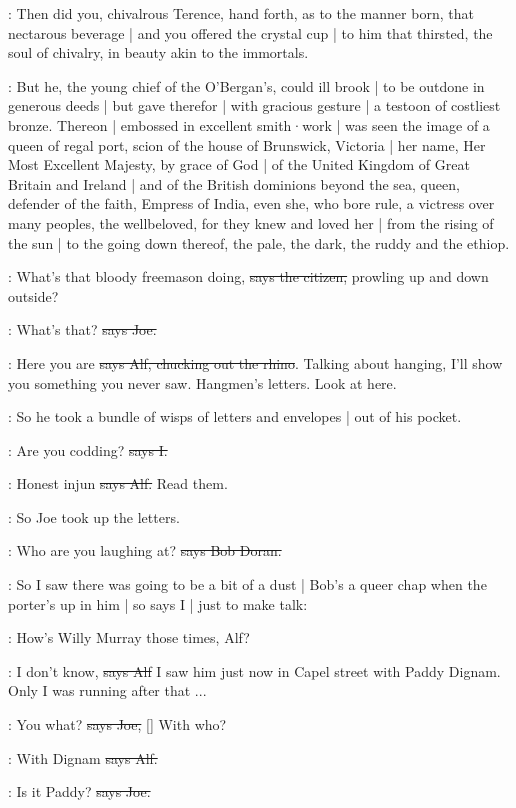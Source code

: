 :
Then did you,
chivalrous Terence,
hand forth,
as to the manner born,
that nectarous beverage |
and you offered the crystal cup |
to him that thirsted,
the soul of chivalry,
in beauty akin to the immortals.

:
But he,
the young chief of the O'Bergan's,
could ill brook |
to be outdone in generous deeds |
but gave therefor |
with gracious gesture |
a testoon of costliest bronze.
Thereon |
embossed in excellent smith·work |
was seen the image of a queen of regal port,
scion of the house of Brunswick,
Victoria |
her name,
Her Most Excellent Majesty,
by grace of God |
of the United Kingdom of Great Britain and Ireland |
and of the British dominions beyond the sea,
queen,
defender of the faith,
Empress of India,
even she,
who bore rule,
a victress over many peoples,
the wellbeloved,
for they knew and loved her |
from the rising of the sun |
to the going down thereof,
the pale,
the dark,
the ruddy and the ethiop.

\citizen:
What's that bloody freemason doing,
\sout{says the citizen,}
prowling up and down outside?

\joe:
What's that?
\sout{says Joe.}

\bergan:
Here you are
\sout{says Alf,
chucking out the rhino}.
Talking about hanging,
I'll show you something you never saw.
Hangmen's letters.
Look at here.

\Nq:
So he took a bundle of wisps of letters and envelopes |
out of his pocket.

:
Are you codding?
\sout{says I.}

\bergan:
Honest injun
\sout{says Alf.}
Read them.

\Nq:
So Joe took up the letters.

\doran:
Who are you laughing at?
\sout{says Bob Doran.}

\Nq:
So I saw there was going to be a bit of a dust |
Bob's a queer chap when the porter's up in him |
so says I |
just to make talk:

:
How's Willy Murray those times,
Alf?

\bergan:
I don't know,
\sout{says Alf}
I saw him just now in Capel street with Paddy Dignam.
Only I was running after that ...

\joe:
You what?
\sout{says Joe,}
[]
With who?

\bergan:
With Dignam
\sout{says Alf.}

\joe:
Is it Paddy?
\sout{says Joe.}


